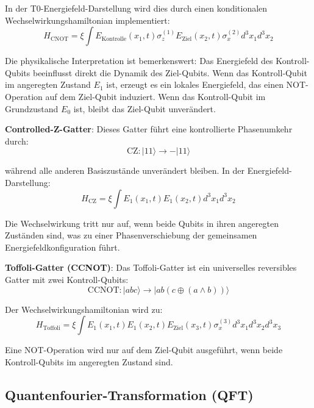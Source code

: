 \documentclass[12pt,a4paper]{article}
\newcommand{\xipar}{\xi}
\theoremstyle{definition}
\theoremstyle{remark}
\begin{document}
In der T0-Energiefeld-Darstellung wird dies durch einen konditionalen Wechselwirkungshamiltonian implementiert:
\begin{equation}
	H_{\text{CNOT}} = \xipar \int E_{\text{Kontrolle}}(x_1,t) \sigma_z^{(1)} E_{\text{Ziel}}(x_2,t) \sigma_x^{(2)} d^3x_1 d^3x_2
	\label{eq:cnot_hamiltonian_detailed}
\end{equation}

Die physikalische Interpretation ist bemerkenswert: Das Energiefeld des Kontroll-Qubits beeinflusst direkt die Dynamik des Ziel-Qubits. Wenn das Kontroll-Qubit im angeregten Zustand $E_1$ ist, erzeugt es ein lokales Energiefeld, das einen NOT-Operation auf dem Ziel-Qubit induziert. Wenn das Kontroll-Qubit im Grundzustand $E_0$ ist, bleibt das Ziel-Qubit unver{\"a}ndert.

\textbf{Controlled-Z-Gatter}:
Dieses Gatter f{\"u}hrt eine kontrollierte Phasenumkehr durch:
\begin{equation}
	\text{CZ}: |11\rangle \rightarrow -|11\rangle
\end{equation}

w{\"a}hrend alle anderen Basiszust{\"a}nde unver{\"a}ndert bleiben. In der Energiefeld-Darstellung:
\begin{equation}
	H_{\text{CZ}} = \xipar \int E_1(x_1,t) E_1(x_2,t) d^3x_1 d^3x_2
\end{equation}

Die Wechselwirkung tritt nur auf, wenn beide Qubits in ihren angeregten Zust{\"a}nden sind, was zu einer Phasenverschiebung der gemeinsamen Energiefeldkonfiguration f{\"u}hrt.

\textbf{Toffoli-Gatter (CCNOT)}:
Das Toffoli-Gatter ist ein universelles reversibles Gatter mit zwei Kontroll-Qubits:
\begin{equation}
	\text{CCNOT}: |abc\rangle \rightarrow |ab(c \oplus (a \land b))\rangle
\end{equation}

Der Wechselwirkungshamiltonian wird zu:
\begin{equation}
	H_{\text{Toffoli}} = \xipar \int E_1(x_1,t) E_1(x_2,t) E_{\text{Ziel}}(x_3,t) \sigma_x^{(3)} d^3x_1 d^3x_2 d^3x_3
\end{equation}

Eine NOT-Operation wird nur auf dem Ziel-Qubit ausgef{\"u}hrt, wenn beide Kontroll-Qubits im angeregten Zustand sind.

\subsection{Quantenfourier-Transformation (QFT)}
\end{document}
